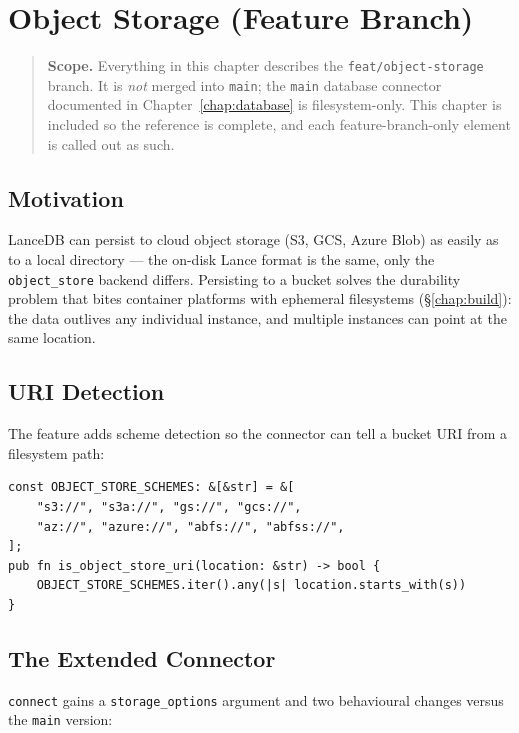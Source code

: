 \chapter{Object Storage (Feature Branch)}
\label{chap:object-storage}

\begin{quote}
\textbf{Scope.} Everything in this chapter describes the
\verb|feat/object-storage| branch. It is \emph{not} merged into \verb|main|; the
\verb|main| database connector documented in Chapter~\ref{chap:database} is
filesystem-only. This chapter is included so the reference is complete, and each
feature-branch-only element is called out as such.
\end{quote}

\section{Motivation}

LanceDB can persist to cloud object storage (S3, GCS, Azure Blob) as easily as to
a local directory --- the on-disk Lance format is the same, only the
\verb|object_store| backend differs. Persisting to a bucket solves the
durability problem that bites container platforms with ephemeral filesystems
(\S\ref{chap:build}): the data outlives any individual instance, and multiple
instances can point at the same location.

\section{URI Detection}

The feature adds scheme detection so the connector can tell a bucket URI from a
filesystem path:

\begin{lstlisting}
const OBJECT_STORE_SCHEMES: &[&str] = &[
    "s3://", "s3a://", "gs://", "gcs://",
    "az://", "azure://", "abfs://", "abfss://",
];
pub fn is_object_store_uri(location: &str) -> bool {
    OBJECT_STORE_SCHEMES.iter().any(|s| location.starts_with(s))
}
\end{lstlisting}

\section{The Extended Connector}

\verb|connect| gains a \verb|storage_options| argument and two behavioural
changes versus the \verb|main| version:


